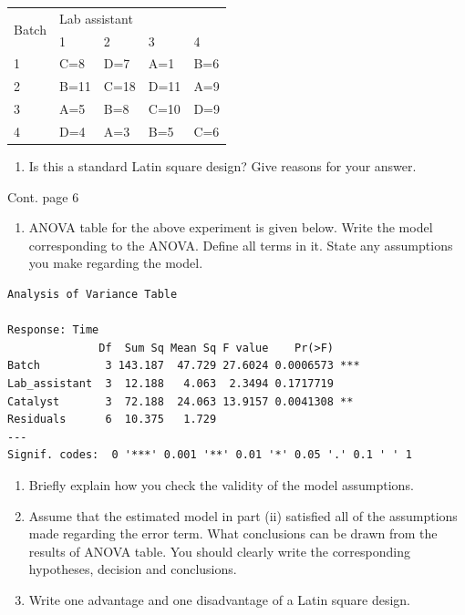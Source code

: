 \documentclass[
  a4paper]{article}
\providecommand{\tightlist}{%
  \setlength{\itemsep}{0pt}\setlength{\parskip}{0pt}}
\begin{document}
\begin{table}[!h]
\centering
\begin{tabular}{|l|llll|}
\hline
\multirow{2}{*}{Batch} & \multicolumn{4}{l|}{Lab assistant}                                                    \\ \cline{2-5} 
                  & \multicolumn{1}{l|}{1} & \multicolumn{1}{l|}{2} & \multicolumn{1}{l|}{3} & 4 \\ \hline
                 1 & \multicolumn{1}{l|}{C=8} & \multicolumn{1}{l|}{D=7} & \multicolumn{1}{l|}{A=1} &  B=6\\ \hline
               2   & \multicolumn{1}{l|}{B=11} & \multicolumn{1}{l|}{C=18} & \multicolumn{1}{l|}{D=11} & A=9 \\ \hline
               3   & \multicolumn{1}{l|}{A=5} & \multicolumn{1}{l|}{B=8} & \multicolumn{1}{l|}{C=10} & D=9 \\ \hline
                4  & \multicolumn{1}{l|}{D=4} & \multicolumn{1}{l|}{A=3} & \multicolumn{1}{l|}{B=5} & C=6 \\ \hline
\end{tabular}
\end{table}

\begin{enumerate}
\def\labelenumi{\roman{enumi})}
\tightlist
\item
  Is this a standard Latin square design? Give reasons for your answer.
\end{enumerate}

Cont. page 6

\newpage

\begin{enumerate}
\def\labelenumi{\roman{enumi})}
\setcounter{enumi}{1}
\tightlist
\item
  ANOVA table for the above experiment is given below. Write the model
  corresponding to the ANOVA. Define all terms in it. State any
  assumptions you make regarding the model.
\end{enumerate}

\begin{verbatim}
Analysis of Variance Table

Response: Time
              Df  Sum Sq Mean Sq F value    Pr(>F)    
Batch          3 143.187  47.729 27.6024 0.0006573 ***
Lab_assistant  3  12.188   4.063  2.3494 0.1717719    
Catalyst       3  72.188  24.063 13.9157 0.0041308 ** 
Residuals      6  10.375   1.729                      
---
Signif. codes:  0 '***' 0.001 '**' 0.01 '*' 0.05 '.' 0.1 ' ' 1
\end{verbatim}

\begin{enumerate}
\def\labelenumi{\roman{enumi})}
\setcounter{enumi}{2}
\item
  Briefly explain how you check the validity of the model assumptions.
\item
  Assume that the estimated model in part (ii) satisfied all of the
  assumptions made regarding the error term. What conclusions can be
  drawn from the results of ANOVA table. You should clearly write the
  corresponding hypotheses, decision and conclusions.
\item
  Write one advantage and one disadvantage of a Latin square design.
\end{enumerate}
\end{document}
